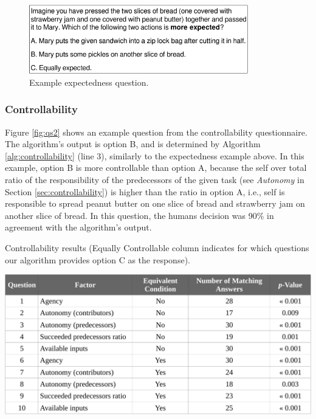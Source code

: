 \documentclass[12pt]{report}
\begin{document}
\begin{figure}[tbh]
  \centering
  \includegraphics[width=0.85\textwidth]{figure/question-sample-croped.pdf}
  \caption{{Example expectedness question.}}
  \label{fig:qs1}
\end{figure}

\subsubsection{Controllability}
\label{sec:controllability-crowdsourcing}
Figure \ref{fig:qs2} shows an example question from the controllability
questionnaire. The algorithm's output is option B, and is determined by
Algorithm \ref{alg:controllability} (line 3), similarly to the expectedness
example above. In this example, option B is more controllable than option A,
because the self over total ratio of the responsibility of the predecessors of
the given task (see \textit{Autonomy} in Section \ref{sec:controllability}) is
higher than the ratio in option A, i.e., self is responsible to spread peanut
butter on one slice of bread and strawberry jam on another slice of bread. In
this question, the humans decision was 90\% in agreement with the algorithm's
output.

\vspace*{3mm}
\begin{table}[tbh]
  \centering
  \caption{Controllability results {\color{red}(Equally Controllable column
  indicates for which questions our algorithm provides option C as the response)}.}
  \label{fig:controllability_result}
  \vspace*{-3mm}
  \includegraphics[width=1\textwidth]{figure/controllability_result_croped.pdf}
\end{table}
\end{document}
